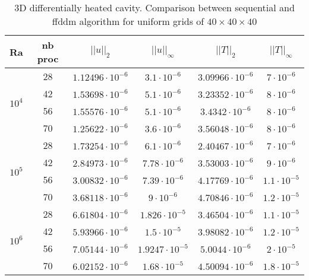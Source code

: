 \begin{table}[!h]
	\begin{center}
		\begin{tabular}{|*{6}{c|}}
			\hline
			 Ra & nb proc                     & $||u||_{2}$                        & $||u||_{\infty}$                & $||T||_{2}$              & $||T||_{\infty}$\\ \hline \hline
			\multirow{4}{*}{$10^4$} & 28 & $1.12496 \cdot 10^{-6}$ & $3.1 \cdot 10^{-6}$ & $ 3.09966 \cdot 10^{-6} $ & $7 \cdot 10^{-6}$ \\%
			\cline{2-6}
			& 42 & $1.53698 \cdot 10^{-6}$ & $5.1 \cdot 10^{-6}$ & $ 3.23352 \cdot 10^{-6} $ & $8 \cdot 10^{-6}$ \\ \cline{2-6} %
			& 56 & $1.55576 \cdot 10^{-6}$ & $5.1 \cdot 10^{-6}$ & $ 3.4342 \cdot 10^{-6} $ & $8 \cdot 10^{-6}$  \\ \cline{2-6} %
			& 70 & $1.25622 \cdot 10^{-6}$ & $3.6 \cdot 10^{-6}$ & $ 3.56048 \cdot 10^{-6} $ & $8 \cdot 10^{-6}$ \\ \hline \hline
			\multirow{4}{*}{$10^5$} & 28 & $1.73254 \cdot 10^{-6}$ & $6.1 \cdot 10^{-6}$ & $ 2.40467 \cdot 10^{-6} $ & $7 \cdot 10^{-6}$ \\%
			\cline{2-6}
			& 42 & $2.84973 \cdot 10^{-6}$ & $7.78 \cdot 10^{-6}$ & $ 3.53003 \cdot 10^{-6} $ & $9 \cdot 10^{-6}$ \\ \cline{2-6} %
			& 56 & $3.00832 \cdot 10^{-6}$ & $7.39 \cdot 10^{-6}$ & $ 4.17769 \cdot 10^{-6} $ & $1.1 \cdot 10^{-5}$  \\ \cline{2-6} %
			& 70 & $3.68118 \cdot 10^{-6}$ & $9 \cdot 10^{-6}$ & $ 4.70846 \cdot 10^{-6} $ & $1.2 \cdot 10^{-5}$ \\ \hline \hline
			\multirow{4}{*}{$10^6$} & 28 & $6.61804 \cdot 10^{-6}$ & $1.826 \cdot 10^{-5}$ & $ 3.46504\cdot 10^{-6} $ & $1.1 \cdot 10^{-5}$ \\%
			\cline{2-6}
			& 42 & $5.93966 \cdot 10^{-6}$ & $1.5 \cdot 10^{-5}$ & $ 3.98082 \cdot 10^{-6} $ & $1.2 \cdot 10^{-5}$ \\ \cline{2-6} %
			& 56 & $7.05144 \cdot 10^{-6}$ & $1.9247 \cdot 10^{-5}$ & $ 5.0044 \cdot 10^{-6} $ & $2 \cdot 10^{-5}$  \\ \cline{2-6} %
			& 70 & $6.02152 \cdot 10^{-6}$ & $1.68 \cdot 10^{-5}$ & $ 4.50094 \cdot 10^{-6} $ & $1.8 \cdot 10^{-5}$ \\ \hline
		\end{tabular}
	\end{center}
	\caption {3D differentially heated cavity. Comparison between sequential and ffddm algorithm for uniform grids of $40 \times 40 \times 40$ }
	\label{tab-T1}
\end{table}


